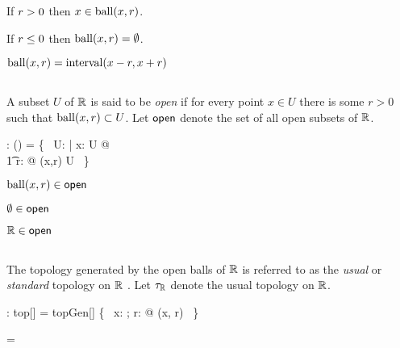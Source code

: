 \documentclass[11pt, oneside]{article}
\begin{document}
\begin{remark}
If $r \mathrel{>} 0$ then $x \in \operatorname{ball}(x, r)$. 
\end{remark}

\begin{remark}
If $r \mathrel{\leq} 0$ then $\operatorname{ball}(x,r) = \emptyset$.
\end{remark}

\begin{remark}
$\operatorname{ball}(x,r) = \operatorname{interval}(x-r, x+r)$
\end{remark}

\subsection{}

A subset $U$ of $\mathbb{R}$ is said to be {\it open} if for every point $x \in U$ there is some $r > 0$ such that $\operatorname{ball}(x,r) \subset U$.
Let $\mathsf{open}$ denote the set of all open subsets of $\mathbb{R}$.

\begin{axdef}
	\openR: \power (\power \R)
\where
	\openR = \{~ U:  \power \R | \forall x: U @ \\
	\t1	\exists r: \Rpos @ \ballRR(x,r) \subset U ~\}
\end{axdef}

\begin{remark}
$\operatorname{ball}(x,r) \in \mathsf{open}$
\end{remark}

\begin{remark}
$\emptyset \in \mathsf{open}$
\end{remark}

\begin{remark}
$\mathbb{R} \in \mathsf{open}$
\end{remark}

\subsection{}

The topology generated by the open balls of $\mathbb{R}$ is referred to as the {\it usual} or {\it standard} topology on $\mathbb{R}$ .
Let $\tau_{\mathbb{R}}$ denote the usual topology on $\mathbb{R}$.

\begin{axdef}
	\tauR: top[\R]
\where
	\tauR = topGen[\R] \{~ x: \R; r: \Rpos @ \ballRR(x, r) ~\}
\end{axdef}

\begin{remark}

\begin{zed}
	\tauR = \openR
\end{zed}

\end{remark}
\end{document}
